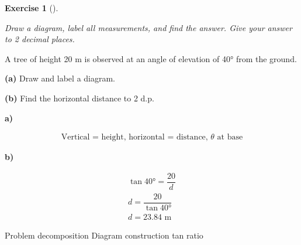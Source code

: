 \documentclass[
  letterpaper,
  DIV=11,
  numbers=noendperiod]{scrreprt}
\theoremstyle{definition}
\newtheorem{exercise}{Exercise}[chapter]
\theoremstyle{remark}
\begin{document}
\begin{exercise}[]\protect\hypertarget{exr-trig-15}{}\label{exr-trig-15}

\emph{Draw a diagram, label all measurements, and find the answer. Give
your answer to 2 decimal places.}

A tree of height 20 m is observed at an angle of elevation of 40° from
the ground.

\textbf{(a)} Draw and label a diagram.

\textbf{(b)} Find the horizontal distance to 2 d.p.

\begin{tcolorbox}[enhanced jigsaw, opacitybacktitle=0.6, coltitle=black, arc=.35mm, colframe=quarto-callout-tip-color-frame, colback=white, bottomrule=.15mm, left=2mm, colbacktitle=quarto-callout-tip-color!10!white, titlerule=0mm, opacityback=0, title=\textcolor{quarto-callout-tip-color}{\faLightbulb}\hspace{0.5em}{🔍 View Solution}, leftrule=.75mm, breakable, rightrule=.15mm, bottomtitle=1mm, toptitle=1mm, toprule=.15mm]

\textbf{a)}

\[
\begin{aligned}
\text{Vertical = height, horizontal = distance, }\theta\text{ at base}
\end{aligned}
\]

\textbf{b)}

\[
\begin{aligned}
\tan 40° = \dfrac{20}{d} \\ d = \dfrac{20}{\tan 40°} \\ d = 23.84 \text{ m}
\end{aligned}
\]

\end{tcolorbox}

{Problem decomposition} {Diagram construction} {tan ratio}

\end{exercise}
\end{document}
